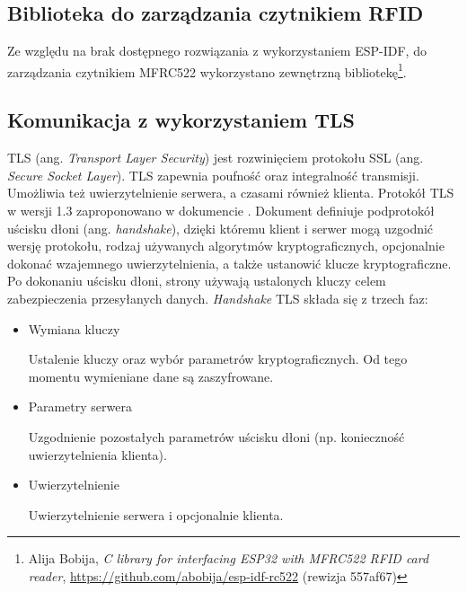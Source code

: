         \subsection{Biblioteka do zarządzania czytnikiem RFID}
        \label{sub:rfid_lib}

            Ze względu na brak dostępnego rozwiązania z wykorzystaniem ESP-IDF, do zarządzania czytnikiem MFRC522 wykorzystano zewnętrzną bibliotekę\footnote{Alija Bobija, \textit{C library for interfacing ESP32 with MFRC522 RFID card reader}, \url{https://github.com/abobija/esp-idf-rc522} (rewizja 557af67)}.

        \subsection{Komunikacja z wykorzystaniem TLS}
        \label{sub:tls}

            TLS (ang. \textit{Transport Layer Security}) jest rozwinięciem protokołu SSL (ang. \textit{Secure Socket Layer}). TLS zapewnia poufność oraz integralność transmisji. Umożliwia też uwierzytelnienie serwera, a czasami również klienta. 
            Protokół TLS w wersji 1.3 zaproponowano w dokumencie \cite{rfc8446}. Dokument definiuje podprotokół uścisku dłoni (ang. \textit{handshake}), dzięki któremu klient i serwer mogą uzgodnić wersję protokołu, rodzaj używanych algorytmów kryptograficznych, opcjonalnie dokonać wzajemnego uwierzytelnienia, a także ustanowić klucze kryptograficzne. Po dokonaniu uścisku dłoni, strony używają ustalonych kluczy celem zabezpieczenia przesyłanych danych.
            \textit{Handshake} TLS składa się z trzech faz:

            \begin{itemize}

                \item Wymiana kluczy

                    Ustalenie kluczy oraz wybór parametrów kryptograficznych. Od tego momentu wymieniane dane są zaszyfrowane.

                \item Parametry serwera

                    Uzgodnienie pozostałych parametrów uścisku dłoni (np. konieczność uwierzytelnienia klienta).

                \item Uwierzytelnienie

                    Uwierzytelnienie serwera i opcjonalnie klienta.
            \end{itemize}

